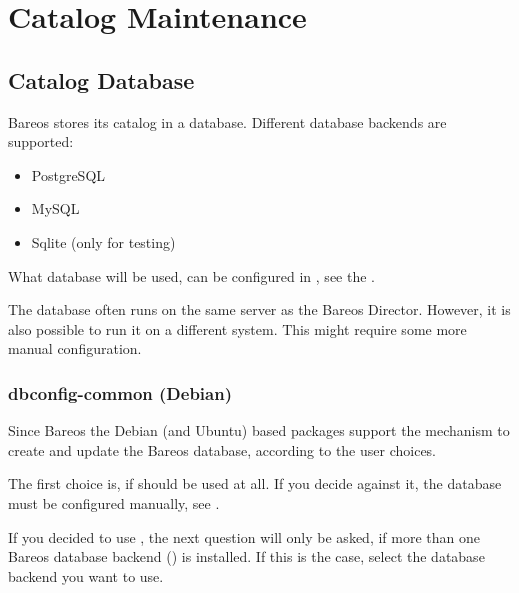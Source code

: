 
\chapter{Catalog Maintenance}
\label{CatMaintenanceChapter}

\section{Catalog Database}

Bareos stores its catalog in a database.
Different database backends are supported:
\begin{itemize}
    \item PostgreSQL
    \item MySQL
    \item Sqlite (only for testing)
\end{itemize}

What database will be used, can be configured in , see the .

The database often runs on the same server as the Bareos Director.
However, it is also possible to run it on a different system.
This might require some more manual configuration.



\subsection{dbconfig-common (Debian)}
\label{sec:dbconfig}

Since Bareos  the Debian (and Ubuntu) based packages support the  mechanism to create and update the Bareos database, according to the user choices.

The first choice is, if  should be used at all.
If you decide against it, the database must be configured manually, see .

If you decided to use , the next question will only be asked, if more than one
Bareos database backend () is installed.
If this is the case, select the database backend you want to use.



